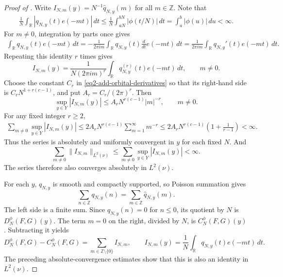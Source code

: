 \documentclass[reqno,12pt]{amsart}
\def \Z {\mathbb Z}
\def \R {\mathbb R}
\numberwithin{equation}{section}
\begin{document}
\begin{proof}[Proof of ]
Write
$I_{N,m}(y)=N^{-1}\widehat q_{N,y}(m)$ for all $m\in \Z$. Note that
\begin{align*}
 \frac1N\int_\R|q_{N,y}(t)e(-mt)|\,dt
 \le\frac1N\int_{aN}^{bN}|\phi(t/N)|\,dt
 =\int_a^b|\phi(u)|\,du<\infty.
\end{align*}
For $m\ne0$, integration by parts once gives
\begin{align*}
 \int_\R q_{N,y}(t)e(-mt)\,dt
 =-\frac1{2\pi im}\int_\R q_{N,y}(t)
       \frac{d}{dt}e(-mt)\,dt
 =\frac1{2\pi im}\int_\R q_{N,y}'(t)e(-mt)\,dt.
\end{align*}
Repeating this identity $r$ times gives
\[
 I_{N,m}(y)=\frac1{N(2\pi im)^r}
 \int_\R q_{N,y}^{(r)}(t)e(-mt)\,dt,
 \qquad m\ne0.
\]
Choose the constant $C_r$ in
\eqref{eq2-add-orbital-derivatives} so that its right-hand side is
$C_rN^{1+r(c-1)}$, and put $A_r=C_r/(2\pi)^r$. Then
\begin{equation}\label{eq2-0}
\sup_{y\in Y}|I_{N,m}(y)|
\le A_r N^{r(c-1)}|m|^{-r},\qquad m\ne0.
\end{equation}
For any fixed integer $r\ge2$,
\begin{align*}
 \sum_{m\ne0}\sup_{y\in Y}|I_{N,m}(y)|
 \le 2A_rN^{r(c-1)}\sum_{m=1}^\infty m^{-r}
 \le 2A_rN^{r(c-1)}\left(1+\frac1{r-1}\right)<\infty.
\end{align*}
Thus the series is absolutely and uniformly convergent in $y$ for
each fixed $N$. And
\[
 \sum_{m\ne0}\|I_{N,m}\|_{L^2(\nu)}
 \le\sum_{m\ne0}\sup_{y\in Y}|I_{N,m}(y)|<\infty.
\]
The series therefore also converges absolutely in $L^2(\nu)$.

For each $y$, $q_{N,y}$ is smooth and compactly supported,
so Poisson summation gives
\[
 \sum_{n\in\Z}q_{N,y}(n)=\sum_{m\in\Z}\widehat q_{N,y}(m).
\]
The left side is a finite sum. Since $q_{N,y}(n)=0$ for $n\le0$, its
quotient by $N$ is $D_N^\phi(F,G)(y)$. The term $m=0$ on the right,
divided by $N$, is $C_N^\phi(F,G)(y)$. Subtracting it yields
\begin{equation}
 D_N^\phi(F,G)-C_N^\phi(F,G)
 =\sum_{m\in\Z\setminus\{0\}}I_{N,m},\qquad
 I_{N,m}(y)=\frac1N\int_\R q_{N,y}(t)e(-mt)\,dt.
 \label{eq2-add-poisson-error}
\end{equation}
The preceding absolute-convergence estimates show that this is also an
identity in $L^2(\nu)$.


\end{proof}
\end{document}
